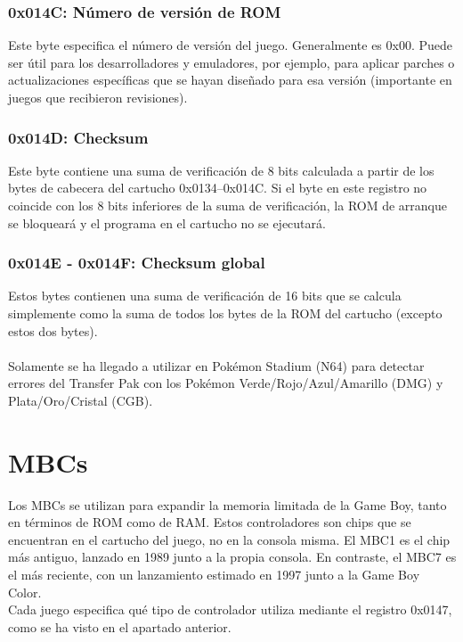 \subsubsection{0x014C: Número de versión de ROM}
Este byte especifica el número de versión del juego. Generalmente es 0x00. Puede ser útil para los desarrolladores y emuladores, por ejemplo, para aplicar parches o actualizaciones específicas que se hayan diseñado para esa versión (importante en juegos que recibieron revisiones).

\subsubsection{0x014D: Checksum}
Este byte contiene una suma de verificación de 8 bits calculada a partir de los bytes de cabecera del cartucho 0x0134–0x014C. Si el byte en este registro no coincide con los 8 bits inferiores de la suma de verificación, la ROM de arranque se bloqueará y el programa en el cartucho no se ejecutará.

\subsubsection{0x014E - 0x014F: Checksum global}
Estos bytes contienen una suma de verificación de 16 bits que se calcula simplemente como la suma de todos los bytes de la ROM del cartucho (excepto estos dos bytes).\\\\
Solamente se ha llegado a utilizar en Pokémon Stadium (N64) para detectar errores del Transfer Pak con los Pokémon Verde/Rojo/Azul/Amarillo (DMG) y Plata/Oro/Cristal (CGB).

\section{MBCs}
\label{history_mbcs}

Los MBCs se utilizan para expandir la memoria limitada de la Game Boy, tanto en términos de ROM como de RAM. Estos controladores son chips que se encuentran en el cartucho del juego, no en la consola misma. El MBC1 es el chip más antiguo, lanzado en 1989 junto a la propia consola. En contraste, el MBC7 es el más reciente, con un lanzamiento estimado en 1997 junto a la Game Boy Color.
\\
Cada juego especifica qué tipo de controlador utiliza mediante el registro 0x0147, como se ha visto en el apartado anterior.

